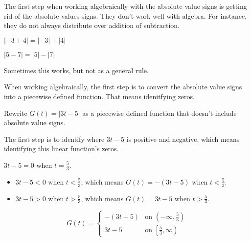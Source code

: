 \documentclass{ximera}
\begin{document}
The first step when working algebraically with the absolute value signs is getting rid of the absolute values signs.  They don't work well with algebra. For instance, they do not always distribute over addition of subtraction.


\begin{question}
$| -3 + 4 | = | -3 | + | 4 |$
  \begin{multipleChoice}
  \end{multipleChoice}
\end{question}


\begin{question}
$| 5 - 7 | = | 5 | - | 7 |$
  \begin{multipleChoice}
  \end{multipleChoice}
\end{question}


Sometimes this works, but not as a general rule.


When working algebraically, the first step is to convert the absolute value signs into a piecewise defined function. That means idenitfying zeros.



\begin{example}


Rewrite $G(t) = | 3t - 5 |$ as a piecewise defined function that doesn't include absolute value signs.


The first step is to identify where $3t - 5$ is positive and negative, which means identifying this linear function's zeros.



$3t-5=0$ when $t=\frac{5}{3}$.


\begin{itemize}
\item $3t - 5 < 0$ when $t<\tfrac{5}{3}$, which means $G(t) = -(3t - 5)$ when $t<\tfrac{5}{3}$.
\item $3t - 5 > 0$ when $t>\tfrac{5}{3}$, which means $G(t) = 3t - 5$ when $t>\tfrac{5}{3}$.
\end{itemize}





\[
G(t) = 
\begin{cases}
  -(3t-5) &\text{on $\left( -\infty, \tfrac{5}{3} \right)$} \\
  3t-5 &\text{on $\left[ \tfrac{5}{3}, \infty \right)$}
\end{cases}
\]






\end{example}
\end{document}
